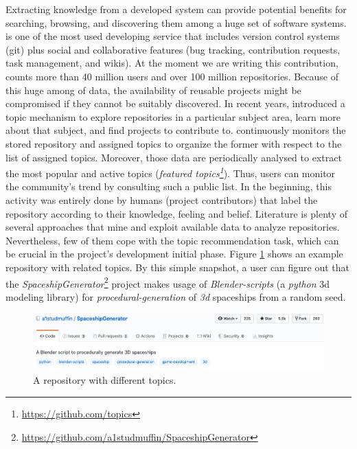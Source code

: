 Extracting knowledge from a developed system can provide potential benefits for searching, browsing, and discovering them among a huge set of software systems.
\GH is one of the most used developing service that includes version control systems (\ie git) plus social and collaborative features (\eg bug tracking, contribution requests, task management, and wikis).
At the moment we are writing this contribution, \GH counts more than 40 million users and over 100 million repositories. Because of this huge among of data, the availability of reusable projects might be compromised if they cannot be suitably discovered. In recent years, \GH introduced a topic mechanism to explore repositories in a particular subject area, learn more about that subject, and find projects to contribute to.
\GH continuously monitors the stored repository and assigned topics to organize the former with respect to the list of assigned topics. Moreover, those data are periodically analysed to extract the most popular and active topics (\ie \emph{featured topics\footnote{\url{https://github.com/topics}}}). Thus, users can monitor the community’s trend by consulting such a public list. In the beginning, this activity was entirely done by humans (\ie project contributors) that label the repository according to their knowledge, feeling and belief. Literature is plenty of several approaches that mine and exploit available data to analyze repositories. Nevertheless, few of them cope with the topic recommendation task, which can be crucial in the project's development initial phase. Figure \ref{fig:SpaceshipGenerator} shows an example repository with related topics. By this simple snapshot, a \GH user can figure out that the \emph{SpaceshipGenerator}\footnote{\label{note:spaceship}\url{https://github.com/a1studmuffin/SpaceshipGenerator}} project makes usage of \emph{Blender-scripts} (\ie a \emph{python} 3d modeling library) for \emph{procedural-generation} of \emph{3d} spaceships from a random seed.



\begin{figure}[h!]
	\centering
	\includegraphics[width=0.99\linewidth]{figs/SpaceshipGenerator.png}
	\caption{A \GH repository with different topics.}
	\label{fig:SpaceshipGenerator}
\end{figure}


